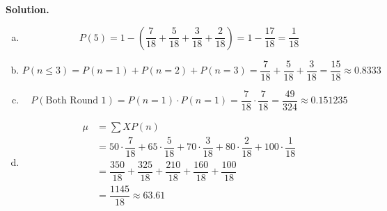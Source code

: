 \documentclass[12pt,letterpaper]{exam}
\begin{document}
\begin{questions}
 \pspace

{\noindent\bfseries Solution.}
\begin{enumerate}[(a)]
\item 
	\[
	P(5)= 1 - \left( \dfrac{7}{18} + \dfrac{5}{18} + \dfrac{3}{18} + \dfrac{2}{18} \right)= 1 - \dfrac{17}{18}= \dfrac{1}{18}
	\] \vfill

\item 
	\[
	P(n \leq 3)= P(n= 1) + P(n= 2) + P(n= 3)= \dfrac{7}{18} + \dfrac{5}{18} + \dfrac{3}{18}= \dfrac{15}{18} \approx 0.8333
	\] \vfill

\item 
	\[
	P(\text{Both Round 1})= P(n= 1) \cdot P(n= 1)= \dfrac{7}{18} \cdot \dfrac{7}{18}= \dfrac{49}{324} \approx 0.151235
	\] \vfill

\item 
	\[
	\begin{aligned}
	\mu&= \sum X P(n) \\[0.1cm]
	&= 50 \cdot \dfrac{7}{18} + 65 \cdot \dfrac{5}{18} + 70 \cdot \dfrac{3}{18} + 80 \cdot \dfrac{2}{18} + 100 \cdot \dfrac{1}{18} \\[0.1cm]
	&= \dfrac{350}{18} + \dfrac{325}{18} + \dfrac{210}{18} + \dfrac{160}{18} + \dfrac{100}{18} \\[0.1cm]
	&= \dfrac{1145}{18} \approx 63.61
	\end{aligned}
	\] \vfill
\end{enumerate}






\end{questions}
\end{document}
